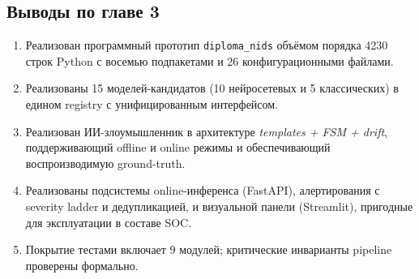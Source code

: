\subsection*{Выводы по главе 3}

\begin{enumerate}
    \item Реализован программный прототип \texttt{diploma\_nids}
    объёмом порядка 4230 строк Python с восемью подпакетами и
    26 конфигурационными файлами.
    \item Реализованы 15 моделей-кандидатов (10 нейросетевых и 5
    классических) в едином registry с унифицированным интерфейсом.
    \item Реализован ИИ-злоумышленник в архитектуре
    \emph{templates + FSM + drift}, поддерживающий offline и online
    режимы и обеспечивающий воспроизводимую ground-truth.
    \item Реализованы подсистемы online-инференса (FastAPI),
    алертирования с severity ladder и дедупликацией, и визуальной
    панели (Streamlit), пригодные для эксплуатации в составе SOC.
    \item Покрытие тестами включает 9 модулей; критические инварианты
    pipeline проверены формально.
\end{enumerate}
